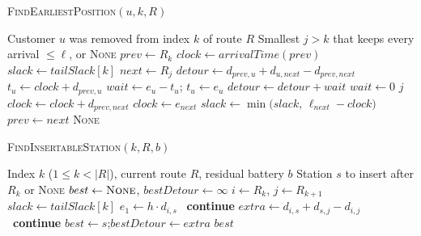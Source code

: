 \documentclass{article}
\begin{document}
\vspace{2em}

\begin{algorithm}[H]
\caption{\textsc{FindEarliestPosition}$(u,k,R)$}
\label{alg:findpos}
\begin{algorithmic}[1]
\Require Customer $u$ was removed from index $k$ of route $R$
\Ensure Smallest $j>k$ that keeps every arrival $\le\ell$, or \textsc{None}
    \State $prev \gets R_{k}$                       
    \State $clock \gets \textit{arrivalTime}(prev)$
    \State $slack \gets \textit{tailSlack}[k]$      
               
        \State $next \gets R_{j}$
        \State $detour \gets d_{prev,u}+d_{u,next}-d_{prev,next}$
        \State $t_u \gets clock + d_{prev,u}$       
            \State $wait \gets e_u - t_u$; \quad $t_u \gets e_u$
            \State $detour \gets detour + wait$
        \Else
            \State $wait \gets 0$
        \EndIf
            \State \Return $j$                      
        \EndIf
        \State $clock \gets clock + d_{prev,next}$  
         \State $clock \gets e_{next}$ \EndIf
        \State $slack \gets \min\bigl(slack,\,\ell_{next}-clock\bigr)$
        \State $prev \gets next$
    \EndFor
    \State \Return \textsc{None}                    
\EndFunction
\end{algorithmic}
\end{algorithm}

\begin{algorithm}[H]
\caption{\textsc{FindInsertableStation}$(k,R,b)$}
\label{alg:findstation}
\begin{algorithmic}[1]
\Require Index $k$ ($1\le k<|R|$), current route $R$, residual battery $b$
\Ensure Station $s$ to insert after $R_k$ or \textsc{None}
    \State $best \gets \textsc{None}$,\; $bestDetour \gets \infty$
    \State $i \gets R_k$, $j \gets R_{k+1}$
    \State $\textit{slack} \gets \textit{tailSlack}[k]$    
                             
        \State $e_1 \gets h\cdot d_{i,s}$                  
        \ \textbf{continue}\EndIf           {}
        \State $extra \gets d_{i,s}+d_{s,j}-d_{i,j}$       
        \ \textbf{continue}\EndIf
            \State $best \gets s$;\quad $bestDetour \gets extra$
        \EndIf
    \EndFor
    \State \Return $best$
\EndFunction
\end{algorithmic}
\end{algorithm}
\end{document}
